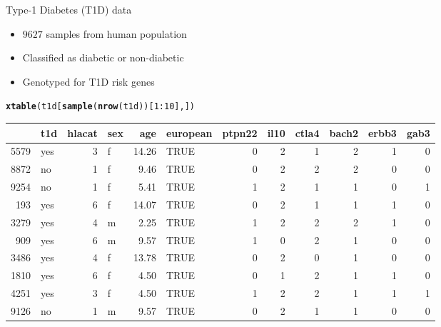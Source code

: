 \documentclass{beamer}\usepackage[]{graphicx}\usepackage[]{color}
\makeatletter
\newcommand{\hlnum}[1]{\textcolor[rgb]{0.686,0.059,0.569}{#1}}%
\newcommand{\hlopt}[1]{\textcolor[rgb]{0,0,0}{#1}}%
\newcommand{\hlstd}[1]{\textcolor[rgb]{0.345,0.345,0.345}{#1}}%
\newcommand{\hlkwd}[1]{\textcolor[rgb]{0.737,0.353,0.396}{\textbf{#1}}}%
\newenvironment{kframe}{%
 \def\at@end@of@kframe{}%
 \ifinner\ifhmode%
  \def\at@end@of@kframe{\end{minipage}}%
  \begin{minipage}{\columnwidth}%
 \fi\fi%
 \def\FrameCommand##1{\hskip\@totalleftmargin \hskip-\fboxsep
 \colorbox{shadecolor}{##1}\hskip-\fboxsep
     \hskip-\linewidth \hskip-\@totalleftmargin \hskip\columnwidth}%
 \MakeFramed {\advance\hsize-\width
   \@totalleftmargin\z@ \linewidth\hsize
   \@setminipage}}%
 {\par\unskip\endMakeFramed%
 \at@end@of@kframe}
\makeatother
\begin{document}
\begin{frame}{Type-1 Diabetes (T1D) data}
  \begin{itemize}
    \item $9627$ samples from human population
    \item Classified as diabetic or non-diabetic
    \item Genotyped for T1D risk genes
  \end{itemize}
  \tiny
\begin{kframe}
\begin{alltt}
\hlkwd{xtable}\hlstd{(t1d[}\hlkwd{sample}\hlstd{(}\hlkwd{nrow}\hlstd{(t1d))[}\hlnum{1}\hlopt{:}\hlnum{10}\hlstd{],])}
\end{alltt}
\end{kframe}%
\begin{table}[ht]
\centering
\begin{tabular}{rlrlrlrrrrrr}
  \hline
 & t1d & hlacat & sex & age & european & ptpn22 & il10 & ctla4 & bach2 & erbb3 & gab3 \\ 
  \hline
5579 & yes &   3 & f & 14.26 & TRUE &   0 &   2 &   1 &   2 &   1 &   0 \\ 
  8872 & no &   1 & f & 9.46 & TRUE &   0 &   2 &   2 &   2 &   0 &   0 \\ 
  9254 & no &   1 & f & 5.41 & TRUE &   1 &   2 &   1 &   1 &   0 &   1 \\ 
  193 & yes &   6 & f & 14.07 & TRUE &   0 &   2 &   1 &   1 &   1 &   0 \\ 
  3279 & yes &   4 & m & 2.25 & TRUE &   1 &   2 &   2 &   2 &   1 &   0 \\ 
  909 & yes &   6 & m & 9.57 & TRUE &   1 &   0 &   2 &   1 &   0 &   0 \\ 
  3486 & yes &   4 & f & 13.78 & TRUE &   0 &   2 &   0 &   1 &   0 &   0 \\ 
  1810 & yes &   6 & f & 4.50 & TRUE &   0 &   1 &   2 &   1 &   1 &   0 \\ 
  4251 & yes &   3 & f & 4.50 & TRUE &   1 &   2 &   2 &   1 &   1 &   1 \\ 
  9126 & no &   1 & m & 9.57 & TRUE &   0 &   2 &   1 &   1 &   0 &   0 \\ 
   \hline
\end{tabular}
\end{table}

\end{frame}
\end{document}
